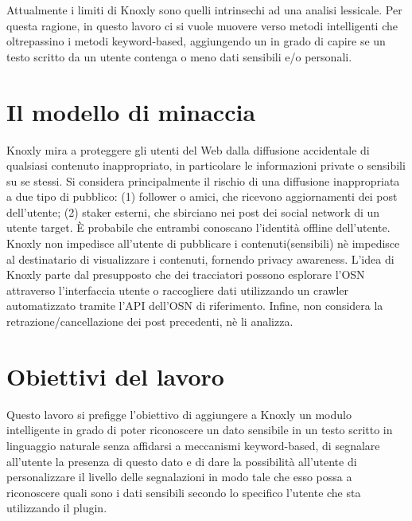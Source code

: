 Attualmente i limiti di Knoxly sono quelli intrinsechi ad una analisi lessicale. Per questa ragione, in questo lavoro ci si vuole muovere verso metodi intelligenti che oltrepassino i metodi keyword-based, aggiungendo un  in grado di capire se un testo scritto da un utente contenga o meno dati sensibili e/o personali.

\section{Il modello di minaccia}
Knoxly mira a proteggere gli utenti del Web dalla diffusione accidentale di qualsiasi contenuto inappropriato, in particolare le informazioni private o sensibili su se stessi. Si considera principalmente il rischio di una diffusione inappropriata a due tipo di pubblico: (1) follower o amici, che ricevono aggiornamenti dei post dell'utente; (2) staker esterni, che sbirciano nei post dei social network di un utente target. È probabile che entrambi conoscano l'identità offline dell'utente. Knoxly non impedisce all'utente di pubblicare i contenuti(sensibili) nè impedisce al destinatario di visualizzare i contenuti, fornendo privacy awareness. L'idea di Knoxly parte dal presupposto che dei tracciatori possono esplorare l'OSN attraverso l'interfaccia utente o raccogliere dati utilizzando un crawler automatizzato tramite l'API dell'OSN di riferimento. Infine, non considera la retrazione/cancellazione dei post precedenti, nè li analizza.

\section{Obiettivi del lavoro}
\label{sec:obiettiviCap1}
Questo lavoro si prefigge l'obiettivo di aggiungere a Knoxly un modulo intelligente in grado di poter riconoscere un dato sensibile in un testo scritto in linguaggio naturale senza affidarsi a meccanismi keyword-based, di segnalare all'utente la presenza di questo dato e di dare la possibilità all'utente di personalizzare il livello delle segnalazioni in modo tale che esso possa  a riconoscere quali sono i dati sensibili secondo lo specifico l'utente che sta utilizzando il plugin.

